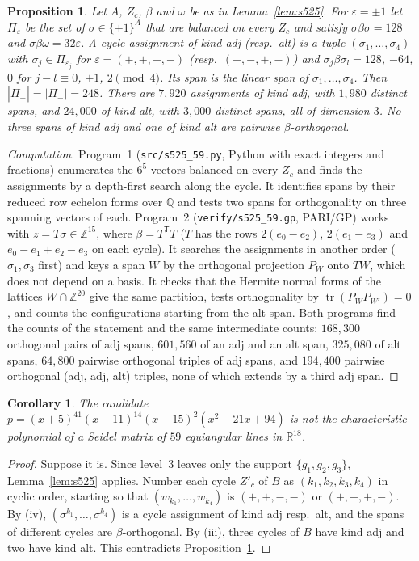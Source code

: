 \documentclass[11pt]{article}
\newtheorem{corollary}[theorem]{Corollary}
\newtheorem{proposition}[theorem]{Proposition}
\theoremstyle{definition}
\newcommand{\Z}{\mathbb{Z}}
\newcommand{\R}{\mathbb{R}}
\newcommand{\tr}{\operatorname{tr}}
\begin{document}
\begin{proposition}\label{prop:s525}
Let $A$, $Z_c$, $\beta$ and $\omega$ be as in Lemma~\ref{lem:s525}. For $\varepsilon=\pm1$ let $\Pi_\varepsilon$
be the set of $\sigma\in\{\pm1\}^A$ that are balanced on every $Z_c$ and satisfy $\sigma\beta\sigma=128$
and $\sigma\beta\omega=32\varepsilon$. A \emph{cycle assignment} of kind \emph{adj} (resp.\ \emph{alt})
is a tuple $(\sigma_1,\dots,\sigma_4)$ with $\sigma_j\in\Pi_{\varepsilon_j}$ for
$\varepsilon=(+,+,-,-)$ (resp.\ $(+,-,+,-)$) and $\sigma_j\beta\sigma_l=128$, $-64$, $0$ for
$j-l\equiv0$, $\pm1$, $2\pmod 4$. Its \emph{span} is the linear span of $\sigma_1,\dots,\sigma_4$. Then
$|\Pi_+|=|\Pi_-|=248$. There are $7{,}920$ assignments of kind adj, with $1{,}980$ distinct spans, and
$24{,}000$ of kind alt, with $3{,}000$ distinct spans, all of dimension $3$. No three spans of kind adj
and one of kind alt are pairwise $\beta$-orthogonal.
\end{proposition}
\begin{proof}[Computation]
Program~1 (\texttt{src/s525\_59.py}, Python with exact integers and fractions) enumerates the $6^5$
vectors balanced on every $Z_c$ and finds the assignments by a depth-first search along the cycle. It
identifies spans by their reduced row echelon forms over $\mathbb Q$ and tests two spans for
orthogonality on three spanning vectors of each. Program~2 (\texttt{verify/s525\_59.gp}, PARI/GP) works
with $z=T\sigma\in\Z^{15}$, where $\beta=T^{\mathsf T}T$ ($T$ has the rows $2(e_0-e_2)$, $2(e_1-e_3)$ and
$e_0-e_1+e_2-e_3$ on each cycle). It searches the assignments in another order ($\sigma_1,\sigma_3$
first) and keys a span $W$ by the orthogonal projection $P_W$ onto $TW$, which does not depend on a basis.
It checks that the Hermite normal forms of the lattices $W\cap\Z^{20}$ give the same partition, tests
orthogonality by $\tr(P_WP_{W'})=0$, and counts the configurations starting from the alt span. Both
programs find the counts of the statement and the same intermediate counts: $168{,}300$ orthogonal pairs
of adj spans, $601{,}560$ of an adj and an alt span, $325{,}080$ of alt spans, $64{,}800$ pairwise
orthogonal triples of adj spans, and $194{,}400$ pairwise orthogonal (adj, adj, alt) triples, none of which
extends by a third adj span.
\end{proof}

\begin{corollary}\label{cor:s525}
The candidate $p=(x+5)^{41}(x-11)^{14}(x-15)^2(x^2-21x+94)$ is not the characteristic polynomial of a
Seidel matrix of $59$ equiangular lines in $\R^{18}$.
\end{corollary}
\begin{proof}
Suppose it is. Since level~3 leaves only the support $\{g_1,g_2,g_3\}$, Lemma~\ref{lem:s525} applies.
Number each cycle $Z'_c$ of $B$ as $(k_1,k_2,k_3,k_4)$ in cyclic order, starting so that
$(w_{k_1},\dots,w_{k_4})$ is $(+,+,-,-)$ or $(+,-,+,-)$. By (iv), $(\sigma^{k_1},\dots,\sigma^{k_4})$ is a
cycle assignment of kind adj resp.\ alt, and the spans of different cycles are $\beta$-orthogonal. By
(iii), three cycles of $B$ have kind adj and two have kind alt. This contradicts
Proposition~\ref{prop:s525}.
\end{proof}
\end{document}
